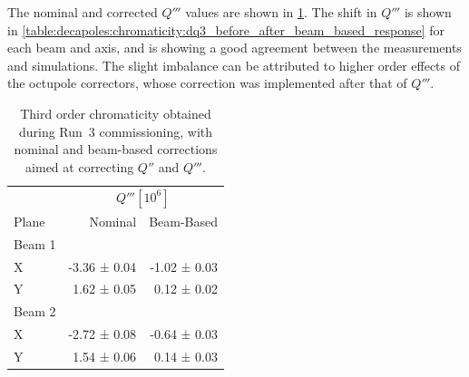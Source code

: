 The nominal and corrected $Q'''$ values are shown in
\cref{table:decapoles:chromaticity:dq3_before_after_beam_based}. The shift in $Q'''$ is shown in 
\cref{table:decapoles:chromaticity:dq3_before_after_beam_based_response} for
each beam and axis, and is showing a good agreement between the measurements and simulations.
The slight imbalance can be attributed to higher order effects of the octupole correctors, whose
correction was implemented after that of $Q'''$.

\begin{table}[H]
    \centering
    \begin{tabular}{lrr}
      \toprule
              &  \multicolumn{2}{c}{$Q''' [10^6]$}  \\
        Plane & Nominal & Beam-Based \\
      \midrule
        Beam 1    &   & \\
        \hspace{2mm}X     &  -3.36 ± 0.04 &  -1.02 ± 0.03 \\
        \hspace{2mm}Y     &   1.62 ± 0.05 &   0.12 ± 0.02 \\
        Beam 2    &           &               \\
        \hspace{2mm}X     &  -2.72 ± 0.08 &  -0.64 ± 0.03 \\
        \hspace{2mm}Y     &   1.54 ± 0.06 &   0.14 ± 0.03 \\
        \bottomrule
    \end{tabular}
    \caption{Third order chromaticity obtained during Run~3 commissioning, with nominal and
    beam-based corrections aimed at correcting $Q''$ and $Q'''$.}
    \label{table:decapoles:chromaticity:dq3_before_after_beam_based}
  \end{table}
  
